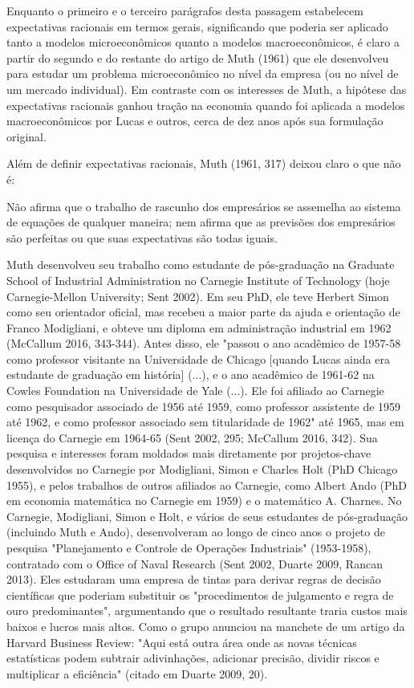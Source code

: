 \documentclass[a4paper,12pt]{article}[abntex2]
\begin{document}
Enquanto o primeiro e o terceiro parágrafos desta passagem estabelecem expectativas racionais em termos gerais, significando que poderia ser aplicado tanto a modelos microeconômicos quanto a modelos macroeconômicos, é claro a partir do segundo e do restante do artigo de Muth (1961) que ele desenvolveu para estudar um problema microeconômico no nível da empresa (ou no nível de um mercado individual). Em contraste com os interesses de Muth, a hipótese das expectativas racionais ganhou tração na economia quando foi aplicada a modelos macroeconômicos por Lucas e outros, cerca de dez anos após sua formulação original.

Além de definir expectativas racionais, Muth (1961, 317) deixou claro o que não é:

Não afirma que o trabalho de rascunho dos empresários se assemelha ao sistema de equações de qualquer maneira; nem afirma que as previsões dos empresários são perfeitas ou que suas expectativas são todas iguais.

Muth desenvolveu seu trabalho como estudante de pós-graduação na Graduate School of Industrial Administration no Carnegie Institute of Technology (hoje Carnegie-Mellon University; Sent 2002). Em seu PhD, ele teve Herbert Simon como seu orientador oficial, mas recebeu a maior parte da ajuda e orientação de Franco Modigliani, e obteve um diploma em administração industrial em 1962 (McCallum 2016, 343-344). Antes disso, ele "passou o ano acadêmico de 1957-58 como professor visitante na Universidade de Chicago [quando Lucas ainda era estudante de graduação em história] (...), e o ano acadêmico de 1961-62 na Cowles Foundation na Universidade de Yale (...). Ele foi afiliado ao Carnegie como pesquisador associado de 1956 até 1959, como professor assistente de 1959 até 1962, e como professor associado sem titularidade de 1962" até 1965, mas em licença do Carnegie em 1964-65 (Sent 2002, 295; McCallum 2016, 342).
Sua pesquisa e interesses foram moldados mais diretamente por projetos-chave desenvolvidos no Carnegie por Modigliani, Simon e Charles Holt (PhD Chicago 1955), e pelos trabalhos de outros afiliados ao Carnegie, como Albert Ando (PhD em economia matemática no Carnegie em 1959) e o matemático A. Charnes. No Carnegie, Modigliani, Simon e Holt, e vários de seus estudantes de pós-graduação (incluindo Muth e Ando), desenvolveram ao longo de cinco anos o projeto de pesquisa "Planejamento e Controle de Operações Industriais" (1953-1958), contratado com o Office of Naval Research (Sent 2002, Duarte 2009, Rancan 2013). Eles estudaram uma empresa de tintas para derivar regras de decisão científicas que poderiam substituir os "procedimentos de julgamento e regra de ouro predominantes", argumentando que o resultado resultante traria custos mais baixos e lucros mais altos. Como o grupo anunciou na manchete de um artigo da Harvard Business Review: "Aqui está outra área onde as novas técnicas estatísticas podem subtrair adivinhações, adicionar precisão, dividir riscos e multiplicar a eficiência" (citado em Duarte 2009, 20).
\end{document}
